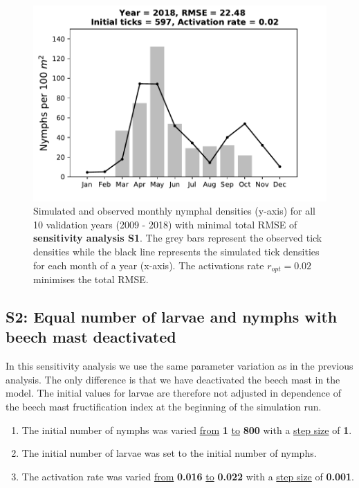 \documentclass[a4paper, 11pt]{scrartcl}
\begin{document}
\begin{figure}[h!]
\begin{minipage}[c]{0.40\linewidth}
\end{minipage}
\begin{minipage}[c]{0.40\linewidth}
\includegraphics[width=\linewidth]{figures/s1/s1_2018}
\end{minipage}
\caption{Simulated and observed monthly nymphal densities (y-axis) for all 10 validation years (2009 - 2018) with minimal total RMSE of \textbf{sensitivity analysis S1}. The grey
bars represent the observed tick densities while the black line represents the simulated tick densities for each month of a year (x-axis). The activations rate $r_{opt} = 0.02$
minimises the total RMSE.}
\label{fig:initial_ticks_with_beech}
\end{figure}


\newpage
\subsection{S2: Equal number of larvae and nymphs with beech mast deactivated}
In this sensitivity analysis we use the same parameter variation as in the previous analysis. The only difference is that we have deactivated the beech mast in the model. The
initial values for larvae are therefore not adjusted in dependence of the beech mast fructification index at the beginning of the simulation run.

\begin{enumerate}
\item The initial number of nymphs was varied \underline{from} \textbf{1} \underline{to} \textbf{800} with a \underline{step size} of \textbf{1}.
\item The initial number of larvae was set to the initial number of nymphs.
\item The activation rate was varied \underline{from} \textbf{0.016} \underline{to} \textbf{0.022} with a \underline{step size} of \textbf{0.001}.
\end{enumerate}
\end{document}
